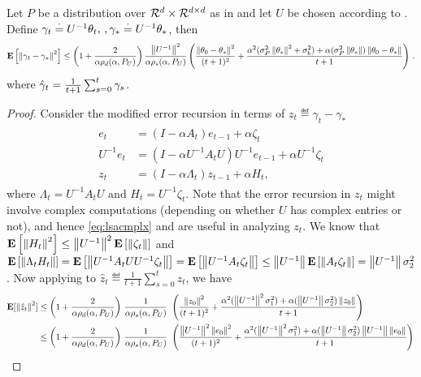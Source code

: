 \begin{lemma}\label{lm:cb}
Let $P$ be a distribution over $\mathcal{R}^d\times \mathcal{R}^{d \times d}$ as in  and let $U$ be chosen according to . Define $\gamma_t\stackrel{\cdot}{=} U^{-1}\theta_t,\,,\gamma_*\stackrel{\cdot}{=} U^{-1}\theta_*$, then
\begin{align}
\mathbf{E}\left[\left\| \gamma_t-\gamma_*\right\|^2\right]
\leq
\left(1+\frac2{\alpha\rho_d(\alpha,P_U)}\right)\frac{\left\| U^{-1}\right\|^2}{\alpha \rho_s(\alpha,P_U)}
\left(\frac{\left\| \theta_0-\theta_*\right\|^2}{(t+1)^2}+ \frac{\alpha^2(\sigma_P^2\left\| \theta_*\right\|^2+\sigma_b^2)+\alpha (\sigma_P^2\left\| \theta_*\right\|)\left\| \theta_0-\theta_*\right\|}{t+1} \right)\,.
\end{align}
where $\hat{\gamma}_t=\frac{1}{t+1}\sum_{s=0}^t \gamma_s$.
\end{lemma}
\begin{proof}
Consider the modified error recursion in terms of $z_t\eqdef \gamma_t-\gamma_*$
\begin{align}\label{eq:newerrrec}
\begin{split}
e_t&=(I-\alpha A_t)e_{t-1}+\alpha\zeta_t\\
U^{-1}e_t&=(I-\alpha U^{-1}A_t U) U^{-1}e_{t-1}+ \alpha U^{-1}\zeta_t\\
z_t&=(I-\alpha \Lambda_t) z_{t-1}+\alpha H_t,
\end{split}
\end{align}
where  $\Lambda_t=U^{-1}A_t U$ and $H_t=U^{-1}\zeta_t$. Note that the error recursion in $z_t$ might involve complex computations (depending on whether $U$ has complex entries or not), and hence \eqref{eq:lsacmplx} and  are useful in analyzing $z_t$.
We know that $\mathbf{E}\left[\left\| H_t\right\|^2\right]\leq \left\| U^{-1}\right\|^2\mathbf{E}\left[\left\| \zeta_t\right\|\right]$ and $\mathbf{E}\left[\left\| \Lambda_t H_t\right\|\right]=\mathbf{E}\left[\left\| U^{-1}A_t UU^{-1}\zeta_t\right\|\right]=\mathbf{E}\left[\left\| U^{-1}A_t \zeta_t\right\|\right]\leq \left\| U^{-1}\right\|\mathbf{E}\left[\left\| A_t\zeta_t\right\|\right]=\left\| U^{-1}\right\|\sigma_2^2$. Now applying  to $\hat{z}_t\eqdef \frac{1}{t+1}\sum_{s=0}^t z_t$, we have
\begin{align}
\mathbf{E}[\left\| \hat{z}_t\right\|^2]
&\leq \left(1+\frac2{\alpha\rho_d(\alpha,P_U)}\right)\, \frac1{\alpha\rho_s(\alpha,P_U)}\, \,
\left(\frac{\left\| z_0\right\|^2}{(t+1)^2}+ \frac{\alpha^2(\left\| U^{-1}\right\|^2\sigma_1^2)+\alpha (\left\| U^{-1}\right\|\sigma_2^2)\left\| z_0\right\|}{t+1} \right)\,\\
&\leq \left(1+\frac2{\alpha\rho_d(\alpha,P_U)}\right)\, \frac1{\alpha\rho_s(\alpha,P_U)}\, \,
\left(\frac{\left\| U^{-1}\right\|^2\left\| e_0\right\|^2}{(t+1)^2}+ \frac{\alpha^2(\left\| U^{-1}\right\|^2\sigma_1^2)+\alpha (\left\| U^{-1}\right\|\sigma_2^2)\left\| U^{-1}\right\|\left\| e_0\right\|}{t+1} \right)\,
\end{align}

\end{proof}

